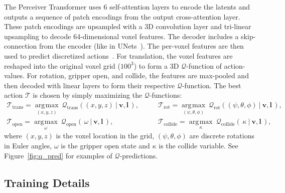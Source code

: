 \documentclass{article}
\newcommand{\figref}[1]{Figure~\ref{#1}}
\DeclareMathOperator*{\argmax}{\arg\!\max}
\begin{document}
The Perceiver Transformer uses 6 self-attention layers to encode the latents and outputs a sequence of patch encodings from the output cross-attention layer. These patch encodings are upsampled with a 3D convolution layer and tri-linear upsampling to decode 64-dimensional voxel features. The decoder includes a skip-connection from the encoder (like in UNets~\citep{ronneberger2015u}). The per-voxel features are then used to predict discretized actions~\citep{c2farm}. For translation, the voxel features are reshaped into the original voxel grid ($100^3$) to form a 3D $\mathcal{Q}$-function of action-values. For rotation, gripper open, and collide, the features are max-pooled and then decoded with linear layers to form their respective $\mathcal{Q}$-function. The best action $\mathcal{T}$ is chosen by simply maximizing the $\mathcal{Q}$-functions:
\begin{align*}
\mathcal{T}_{\textrm{trans}} = \underset{(x,y,z)}{\argmax} \  \mathcal{Q}_{\textrm{trans}}((x,y,z) \ | \ \mathbf{v}, \mathbf{l} \,), \hspace{1cm}  &
\mathcal{T}_{\textrm{rot}} = \underset{(\psi,\theta,\phi)}{\argmax} \  \mathcal{Q}_{\textrm{rot}}((\psi,\theta,\phi) \ | \ \mathbf{v}, \mathbf{l} \,), \\
\mathcal{T}_{\textrm{open}} = \underset{\omega}{\argmax} \  \mathcal{Q}_{\textrm{open}}(\, \omega \ | \ \mathbf{v}, \mathbf{l} \,), \hspace{1cm}  &
\mathcal{T}_{\textrm{collide}} = \underset{\kappa}{\argmax} \ \mathcal{Q}_{\textrm{collide}}(\, \kappa \ | \ \mathbf{v}, \mathbf{l} \,),
\end{align*}
where $(x, y, z)$ is the voxel location in the grid, $(\psi, \theta, \phi)$ are discrete rotations in Euler angles, $\omega$ is the gripper open state and $\kappa$ is the collide variable. See \figref{fig:q_pred} for examples of  $\mathcal{Q}$-predictions.

\vspace{-0.1cm}
\subsection{Training Details}
\label{sec:training}
\vspace{-0.1cm}
\end{document}
